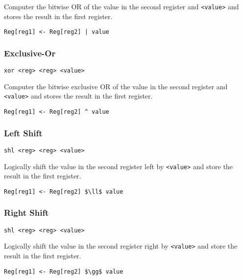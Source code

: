 Computer the bitwise OR of the value in the second register and \texttt{<value>} and stores the result in the first register.

\begin{lstlisting}[style=rtn,mathescape]
    Reg[reg1] <- Reg[reg2] | value
\end{lstlisting}

\subsubsection{Exclusive-Or}

\begin{lstlisting}[style=assembly]
    xor <reg> <reg> <value>
\end{lstlisting}

Computer the bitwise exclusive OR of the value in the second register and \texttt{<value>} and stores the result in the first register.

\begin{lstlisting}[style=rtn,mathescape]
    Reg[reg1] <- Reg[reg2] ^ value
\end{lstlisting}

\subsubsection{Left Shift}

\begin{lstlisting}[style=assembly]
    shl <reg> <reg> <value>
\end{lstlisting}

Logically shift the value in the second register left by \texttt{<value>} and store the result in the first register.

\begin{lstlisting}[style=rtn,mathescape]
    Reg[reg1] <- Reg[reg2] $\ll$ value
\end{lstlisting}

\subsubsection{Right Shift}

\begin{lstlisting}[style=assembly]
    shl <reg> <reg> <value>
\end{lstlisting}

Logically shift the value in the second register right by \texttt{<value>} and store the result in the first register.

\begin{lstlisting}[style=rtn,mathescape]
    Reg[reg1] <- Reg[reg2] $\gg$ value
\end{lstlisting}

